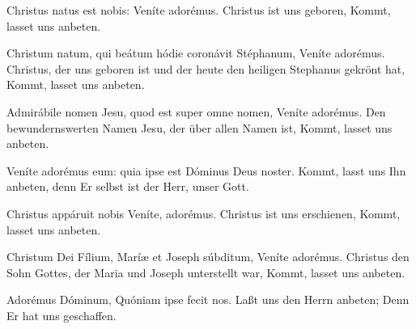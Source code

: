 \documentclass[fontsize=9pt,paper=A6,twoside,BCOR=1mm,DIV=22,headinclude]{scrarticle}
\begin{document}
\begin{paracol}{2}\pcb
	Christus natus est nobis: \red{*} Veníte adorémus.
	\switchcolumn
	Christus ist uns geboren, \red{*} Kommt, lasset uns anbeten.
\end{paracol}

\begin{paracol}{2}\pcb
	Christum natum, qui beátum hódie coronávit Stéphanum, \red{*} Veníte adorémus.
	\switchcolumn
	Christus, der uns geboren ist und der heute den heiligen Stephanus gekrönt hat, \red{*} Kommt, lasset uns anbeten.
\end{paracol}
	
\begin{paracol}{2}\pcb
	Admirábile nomen Jesu, quod est super omne nomen, \red{*} Veníte adorémus.
	\switchcolumn
	Den bewundernswerten Namen Jesu, der über allen Namen ist, \red{*} Kommt, lasset uns anbeten. 
\end{paracol}

\pagebreak
{}
\begin{paracol}{2}\pcb
	Veníte adorémus eum: \red{*} quia ipse est Dóminus Deus noster.
	\switchcolumn
	Kommt, lasst uns Ihn anbeten, \red{*} denn Er selbst ist der Herr, unser Gott.
\end{paracol}

\begin{paracol}{2}\pcb
	Christus appáruit nobis \red{*} Veníte, adorémus.
	\switchcolumn
	Christus ist uns erschienen, \red{*} Kommt, lasset uns anbeten.
\end{paracol}

\begin{paracol}{2}\pcb
	Christum Dei Fílium, Maríæ et Joseph súbditum, \red{*} Veníte adorémus.
	\switchcolumn
	Christus den Sohn Gottes, der Maria und Joseph unterstellt war, \red{*} Kommt, lasset uns anbeten.
\end{paracol}

\begin{paracol}{2}\pcb
	Adorémus Dóminum, \red{*} Quóniam ipse fecit nos.
	\switchcolumn
	Laßt uns den Herrn anbeten; \red{*} Denn Er hat uns geschaffen.
\end{paracol}
\end{document}
